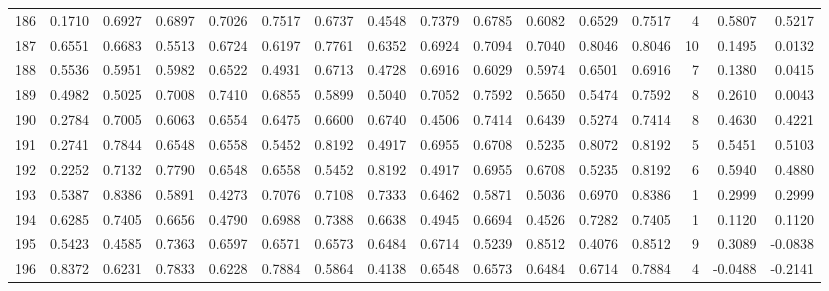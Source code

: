 \begin{tabular}{lrrrrrrrrrrrrrrr}
186 &      0.1710 &  0.6927 &  0.6897 &  0.7026 &  0.7517 &  0.6737 &  0.4548 &  0.7379 &  0.6785 &  0.6082 &   0.6529 &     0.7517 &      4 &                    0.5807 &                     0.5217 \\
187 &      0.6551 &  0.6683 &  0.5513 &  0.6724 &  0.6197 &  0.7761 &  0.6352 &  0.6924 &  0.7094 &  0.7040 &   0.8046 &     0.8046 &     10 &                    0.1495 &                     0.0132 \\
188 &      0.5536 &  0.5951 &  0.5982 &  0.6522 &  0.4931 &  0.6713 &  0.4728 &  0.6916 &  0.6029 &  0.5974 &   0.6501 &     0.6916 &      7 &                    0.1380 &                     0.0415 \\
189 &      0.4982 &  0.5025 &  0.7008 &  0.7410 &  0.6855 &  0.5899 &  0.5040 &  0.7052 &  0.7592 &  0.5650 &   0.5474 &     0.7592 &      8 &                    0.2610 &                     0.0043 \\
190 &      0.2784 &  0.7005 &  0.6063 &  0.6554 &  0.6475 &  0.6600 &  0.6740 &  0.4506 &  0.7414 &  0.6439 &   0.5274 &     0.7414 &      8 &                    0.4630 &                     0.4221 \\
191 &      0.2741 &  0.7844 &  0.6548 &  0.6558 &  0.5452 &  0.8192 &  0.4917 &  0.6955 &  0.6708 &  0.5235 &   0.8072 &     0.8192 &      5 &                    0.5451 &                     0.5103 \\
192 &      0.2252 &  0.7132 &  0.7790 &  0.6548 &  0.6558 &  0.5452 &  0.8192 &  0.4917 &  0.6955 &  0.6708 &   0.5235 &     0.8192 &      6 &                    0.5940 &                     0.4880 \\
193 &      0.5387 &  0.8386 &  0.5891 &  0.4273 &  0.7076 &  0.7108 &  0.7333 &  0.6462 &  0.5871 &  0.5036 &   0.6970 &     0.8386 &      1 &                    0.2999 &                     0.2999 \\
194 &      0.6285 &  0.7405 &  0.6656 &  0.4790 &  0.6988 &  0.7388 &  0.6638 &  0.4945 &  0.6694 &  0.4526 &   0.7282 &     0.7405 &      1 &                    0.1120 &                     0.1120 \\
195 &      0.5423 &  0.4585 &  0.7363 &  0.6597 &  0.6571 &  0.6573 &  0.6484 &  0.6714 &  0.5239 &  0.8512 &   0.4076 &     0.8512 &      9 &                    0.3089 &                    -0.0838 \\
196 &      0.8372 &  0.6231 &  0.7833 &  0.6228 &  0.7884 &  0.5864 &  0.4138 &  0.6548 &  0.6573 &  0.6484 &   0.6714 &     0.7884 &      4 &                   -0.0488 &                    -0.2141 \\

\end{tabular}
